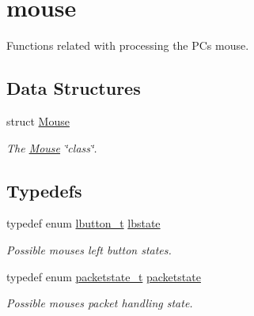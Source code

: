 \hypertarget{group__mouse}{}\section{mouse}
\label{group__mouse}


Functions related with processing the PC\textquotesingle{}s mouse.  


\subsection*{Data Structures}
\begin{DoxyCompactItemize}
\item 
struct \hyperlink{struct_mouse}{Mouse}
\begin{DoxyCompactList}\small\item\em The \hyperlink{struct_mouse}{Mouse} \char`\"{}class\char`\"{}. \end{DoxyCompactList}\end{DoxyCompactItemize}
\subsection*{Typedefs}
\begin{DoxyCompactItemize}
\item 
\hypertarget{group__mouse_gaab5a16f4c5c371d5048e7a729a8b45c7}{}\label{group__mouse_gaab5a16f4c5c371d5048e7a729a8b45c7} 
typedef enum \hyperlink{group__mouse_ga3a546a0495d63ebc047bb726b47a4425}{lbutton\+\_\+t} \hyperlink{group__mouse_gaab5a16f4c5c371d5048e7a729a8b45c7}{lbstate}
\begin{DoxyCompactList}\small\item\em Possible mouse\textquotesingle{}s left button states. \end{DoxyCompactList}\item 
\hypertarget{group__mouse_ga15fce23ec12347df2f9ef8c3366eb01d}{}\label{group__mouse_ga15fce23ec12347df2f9ef8c3366eb01d} 
typedef enum \hyperlink{group__mouse_ga5fe920806b75c05466affe22b6156a21}{packetstate\+\_\+t} \hyperlink{group__mouse_ga15fce23ec12347df2f9ef8c3366eb01d}{packetstate}
\begin{DoxyCompactList}\small\item\em Possible mouse\textquotesingle{}s packet handling state. \end{DoxyCompactList}\end{DoxyCompactItemize}
